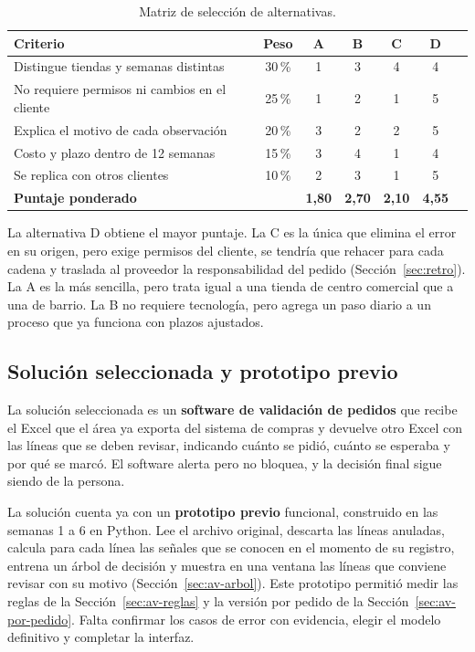 \begin{table}[htbp]
\centering
\caption{Matriz de selección de alternativas.}
\label{tab:seleccion}
\small
\begin{tabularx}{\textwidth}{@{}Ycccccc@{}}
\toprule
\textbf{Criterio} & \textbf{Peso} & \textbf{A} & \textbf{B} & \textbf{C} & \textbf{D} \\
\midrule
Distingue tiendas y semanas distintas & 30\,\% & 1 & 3 & 4 & 4 \\
No requiere permisos ni cambios en el cliente & 25\,\% & 1 & 2 & 1 & 5 \\
Explica el motivo de cada observación & 20\,\% & 3 & 2 & 2 & 5 \\
Costo y plazo dentro de 12 semanas & 15\,\% & 3 & 4 & 1 & 4 \\
Se replica con otros clientes & 10\,\% & 2 & 3 & 1 & 5 \\
\midrule
\textbf{Puntaje ponderado} & & \textbf{1,80} & \textbf{2,70} & \textbf{2,10} & \textbf{4,55} \\
\bottomrule
\end{tabularx}
\end{table}

La alternativa D obtiene el mayor puntaje. La C es la única que elimina el error en su origen, pero exige permisos del cliente, se tendría que rehacer para cada cadena y traslada al proveedor la responsabilidad del pedido (Sección~\ref{sec:retro}). La A es la más sencilla, pero trata igual a una tienda de centro comercial que a una de barrio. La B no requiere tecnología, pero agrega un paso diario a un proceso que ya funciona con plazos ajustados.

\subsection{Solución seleccionada y prototipo previo}

La solución seleccionada es un \textbf{software de validación de pedidos} que recibe el Excel que el área ya exporta del sistema de compras y devuelve otro Excel con las líneas que se deben revisar, indicando cuánto se pidió, cuánto se esperaba y por qué se marcó. El software alerta pero no bloquea, y la decisión final sigue siendo de la persona.

La solución cuenta ya con un \textbf{prototipo previo} funcional, construido en las semanas 1 a 6 en Python. Lee el archivo original, descarta las líneas anuladas, calcula para cada línea las señales que se conocen en el momento de su registro, entrena un árbol de decisión y muestra en una ventana las líneas que conviene revisar con su motivo (Sección~\ref{sec:av-arbol}). Este prototipo permitió medir las reglas de la Sección~\ref{sec:av-reglas} y la versión por pedido de la Sección~\ref{sec:av-por-pedido}. Falta confirmar los casos de error con evidencia, elegir el modelo definitivo y completar la interfaz.

